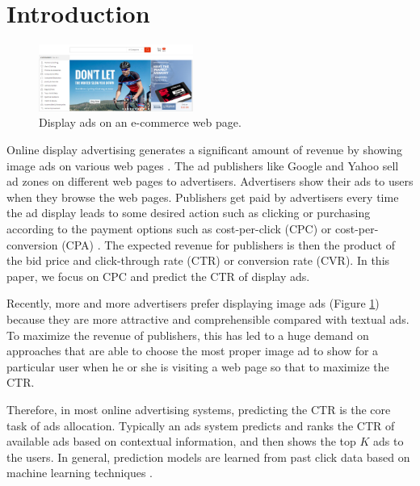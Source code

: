 \documentclass{sig-alternate}
\begin{document}
\section{Introduction}
\begin{figure}
	\centering
	\includegraphics[width=0.45\textwidth]{ad}
	\caption{Display ads on an e-commerce web page.}
	\label{fig:ad}
\end{figure}
Online display advertising generates a significant amount of revenue by showing image ads on various web pages \cite{chapelle2014simple}.   The ad publishers like Google and Yahoo sell  ad zones on different web pages to advertisers. Advertisers show their ads to users when they browse the web pages. Publishers get paid by advertisers every time the ad display leads to some desired action  such as clicking or purchasing according to the payment options such as cost-per-click (CPC) or cost-per-conversion (CPA) \cite{mahdian2007pay}. The expected revenue for publishers is then the product of the bid price and click-through rate (CTR) or conversion rate (CVR). In this paper, we focus on CPC and predict the CTR of display ads.

Recently, more and more advertisers prefer displaying image ads (Figure \ref{fig:ad}) because they are more attractive and comprehensible compared with textual ads.   To maximize the revenue of publishers,  this has led to a huge demand on approaches that are able to choose the most proper image ad to show for a particular user when he or she is visiting a web page so that to maximize the CTR. 

Therefore, in most online advertising systems, predicting the CTR is the core task of ads allocation. Typically an ads system  predicts and ranks the CTR of available ads based on contextual information, and then shows the top $K$ ads to the users. In general, prediction models are learned from past click data based on machine learning techniques \cite{chapelle2014simple,  richardson2007predicting, he2014practical, dave2010learning, zhang2016deep,mcmahan2013ad}.
\end{document}
